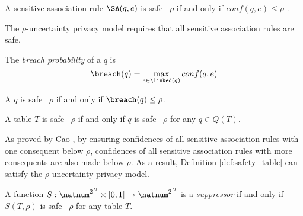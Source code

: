 \begin{definition}
\label{def:safety_rule} A sensitive association rule $\SA(q,e)$ is safe
\wrt~$\rho$ if and only if $conf(q,e)\leq\rho$ .
\end{definition}

The $\rho$-uncertainty privacy model requires that all sensitive association
rules are safe.

\begin{definition}
\label{def:probability} The \emph{breach probability} of a \qid $q$ is \[
\breach(q) = \max_{e\in\linked(q)} conf(q,e) \]
\end{definition}

\begin{definition}%
\label{def:safety_qid}
A \qid $q$ is safe \wrt~$\rho$ if and only if $\breach(q)\leq\rho$.
\end{definition}

\begin{definition}%
\label{def:safety_table}
A table $T$ is safe \wrt~$\rho$ if and only if $q$ is safe \wrt~$\rho$ for any \qid $q\in Q(T)$.
\end{definition}

As proved by Cao \etal \cite{Cao:2010:rho}, by ensuring confidences of all
sensitive association rules with one consequent below $\rho$,
confidences of all sensitive association rules with more consequents are also
made below $\rho$. As a result, Definition \ref{def:safety_table} can satisfy
the $\rho$-uncertainty privacy model.

\begin{definition}[Suppressor]
\label{def:suppressor}
A function $S : \natnum^{2^D}\times[0,1]\rightarrow\natnum^{2^D}$ is a \emph{suppressor} if and only if $S(T,\rho)$ is safe \wrt~$\rho$ for any table $T$.
\end{definition}
%
%

